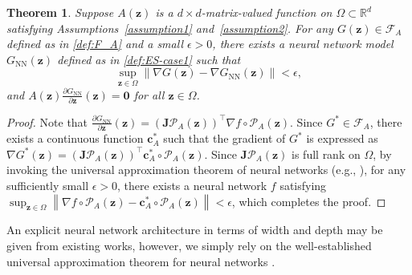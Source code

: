 \documentclass[openacc]{rsproca_new}%
\newcommand{\z}{\bm{z}}
\newtheorem{remark}{Remark}
\newtheorem{theorem}{Theorem}
\begin{document}
\begin{theorem}
    Suppose $A(\z)$ is a $d\times d$-matrix-valued function on $\Omega \subset \mathbb{R}^d$
    satisfying Assumptions~\ref{assumption1}
    and~\ref{assumption2}.
    For any $G(\z) \in \mathcal{F}_{A}$
    defined as in \eqref{def:F_A}
    and a small $\epsilon > 0$,
    there exists
    a neural network model $G_{\text{NN}}(\z)$
    defined as in \eqref{def:ES-case1}
    such that  
    \begin{equation*}
        \sup_{\z \in \Omega} 
        \|\nabla G(\z) - \nabla G_{\text{NN}}(\z) \| < \epsilon,
    \end{equation*}
    and $A(\z)\frac{\partial G_{\text{NN}}}{\partial \z}(\z)= \bm{0}$
   for all $\z \in \Omega$.
\end{theorem}
\begin{proof}
Note that 
$\frac{\partial G_{\text{NN}}}{\partial \z}(\z) = (\textbf{J}\mathcal{P}_A(\z))^\top \nabla f \circ \mathcal{P}_A(\z)$.
Since $G^* \in \mathcal{F}_A$, 
there exists a continuous function 
$\bm{c}_A^*$ such that 
the gradient of $G^*$ is expressed as 
$\nabla G^*(\z) = (\textbf{J}\mathcal{P}_A(\z))^\top \bm{c}_A^* \circ \mathcal{P}_A(\z)$.
Since $\textbf{J}\mathcal{P}_A(\z)$ is full rank on $\Omega$,
by invoking the universal approximation theorem of neural networks (e.g., \cite{li1996simultaneous,siegel2020approximation}), 
for any sufficiently small $\epsilon > 0$,
there exists a neural network $f$
satisfying 
$
\sup_{\z \in \Omega} \left\|
\nabla f \circ \mathcal{P}_A(\z) -\bm{c}_A^* \circ \mathcal{P}_A(\z) \right\| < \epsilon
$,
which completes the proof.
\end{proof}






An explicit neural network architecture in terms of width and depth may be given 
from existing works,
however, we simply rely on the well-established 
universal approximation theorem for neural networks 
\cite{Cybenko_MoC89,Mhaskar_Neurl96,li1996simultaneous,siegel2020approximation}.
\end{document}
